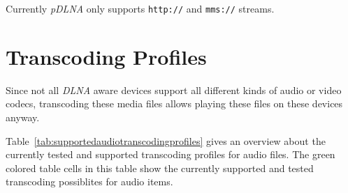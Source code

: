 \documentclass[a4paper,oneside,10pt]{report}
\begin{document}
Currently {\em pDLNA} only supports \verb|http://| and \verb|mms://| streams.

\section{Transcoding Profiles}
\label{Transcoding_Profiles}

Since not all {\em DLNA} aware devices support all different kinds of audio or video codecs, transcoding these media files allows playing these files on these devices anyway.

Table~\ref{tab:supportedaudiotranscodingprofiles} gives an overview about the currently tested and supported transcoding profiles for audio files. The green colored table cells in this table show the currently supported and tested transcoding possiblites for audio items.
\end{document}
